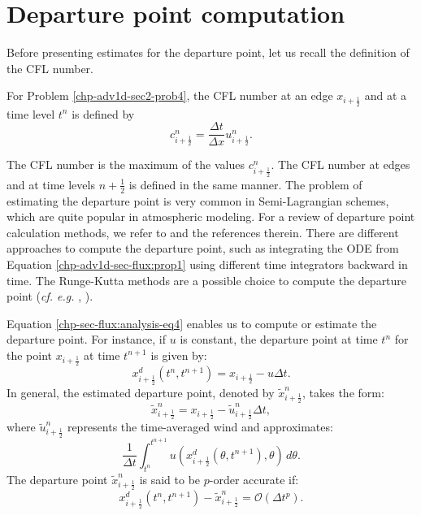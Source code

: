 \section{Departure point computation}
\label{chp-adv1d-sec-dp}
Before presenting estimates for the departure point,
let us recall the definition of the CFL number.
\begin{definition}
	\label{chp-adv1d-sec-flux:cfl}
	For Problem \ref{chp-adv1d-sec2-prob4}, the CFL number at an edge $x_{i+\frac{1}{2}}$ and at a time level $t^n$ is defined by
	\begin{equation}
		c^n_{i+\frac{1}{2}} = \frac{\Delta t}{\Delta x}u^n_{i+\frac{1}{2}}.
	\end{equation}
\end{definition}
The CFL number is the maximum of the values $c^n_{i+\frac{1}{2}}$.
The CFL number at edges and at time levels $n+\frac{1}{2}$ is defined in the same manner.
The problem of estimating the departure point is very common in Semi-Lagrangian schemes, which are 
quite popular in atmospheric modeling. For a review of departure point calculation methods, we refer
to \citet[Chapter 3]{tumolo:2011} and the references therein. There are different approaches to compute
the departure point, such as integrating the ODE from Equation \eqref{chp-adv1d-sec-flux:prop1} using different
time integrators \citep{durran:2011} backward in time. The Runge-Kutta methods are a possible choice to 
compute the departure point (\textit{cf. e.g.} \citet{guo:2014}, \citet{lu:2022}). 

Equation \eqref{chp-sec-flux:analysis-eq4} enables us to compute or estimate the departure point.
For instance, if $u$ is constant, the departure point at time $t^n$ for the point $x_{i+\frac{1}{2}}$ at time $t^{n+1}$ is given by:
\begin{equation}
	\label{chp-sec-dp-eq1}
   x_{i+\frac{1}{2}}^d(t^n,t^{n+1}) = x_{i+\frac{1}{2}} - u\Delta t.
\end{equation}
In general, the estimated departure point, denoted by $\tilde{x}_{i+\frac{1}{2}}^n$, takes the form:
\begin{equation}
	\label{chp-sec-dp-eq2}
	\tilde{x}_{i+\frac{1}{2}}^n = x_{i+\frac{1}{2}} - \tilde{u}^{n}_{i+\frac{1}{2}}\Delta t,
\end{equation}
where $\tilde{u}^{n}_{i+\frac{1}{2}}$ represents the time-averaged wind and approximates:
\begin{equation}
	\label{chp-sec-dp-eq3}
	\frac{1}{\Delta t}\int_{t^n}^{t^{n+1}}u( x_{i+\frac{1}{2}}^d(\theta,t^{n+1}),\theta) \,d\theta.
\end{equation}
The departure point $\tilde{x}_{i+\frac{1}{2}}^n$ is said to be $p$-order accurate if:
\begin{equation}
	\label{chp-sec-dp-eq4}
	x_{i+\frac{1}{2}}^d(t^n,t^{n+1}) - \tilde{x}_{i+\frac{1}{2}}^n = \mathcal{O}(\Delta t^p).
\end{equation}

